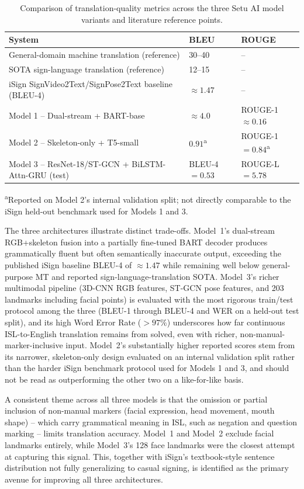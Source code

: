 \documentclass[pdflatex,sn-mathphys-num]{sn-jnl}
\begin{document}
\begin{table}[h]
\centering
\caption{Comparison of translation-quality metrics across the three Setu AI model variants and literature reference points.}\label{tab:results}
\begin{tabular}{@{}lll@{}}
\toprule
System & BLEU & ROUGE \\
\midrule
General-domain machine translation (reference) & 30--40 & -- \\
SOTA sign-language translation (reference) & 12--15 & -- \\
iSign SignVideo2Text/SignPose2Text baseline~\cite{isign} (BLEU-4) & $\approx 1.47$ & -- \\
Model 1 -- Dual-stream + BART-base & $\approx 4.0$ & ROUGE-1 $\approx 0.16$ \\
Model 2 -- Skeleton-only + T5-small & $0.91$\textsuperscript{a} & ROUGE-1 $= 0.84$\textsuperscript{a} \\
Model 3 -- ResNet-18/ST-GCN + BiLSTM-Attn-GRU (test) & BLEU-4 $= 0.53$ & ROUGE-L $= 5.78$ \\
\bottomrule
\end{tabular}
\end{table}
\noindent\textsuperscript{a}Reported on Model 2's internal validation split; not directly comparable to the iSign held-out benchmark used for Models 1 and 3.

The three architectures illustrate distinct trade-offs. Model~1's dual-stream RGB+skeleton fusion into a partially fine-tuned BART decoder produces grammatically fluent but often semantically inaccurate output, exceeding the published iSign baseline BLEU-4 of $\approx 1.47$ while remaining well below general-purpose MT and reported sign-language-translation SOTA. Model~3's richer multimodal pipeline (3D-CNN RGB features, ST-GCN pose features, and 203 landmarks including facial points) is evaluated with the most rigorous train/test protocol among the three (BLEU-1 through BLEU-4 and WER on a held-out test split), and its high Word Error Rate ($>97\%$) underscores how far continuous ISL-to-English translation remains from solved, even with richer, non-manual-marker-inclusive input. Model~2's substantially higher reported scores stem from its narrower, skeleton-only design evaluated on an internal validation split rather than the harder iSign benchmark protocol used for Models 1 and 3, and should not be read as outperforming the other two on a like-for-like basis.

A consistent theme across all three models is that the omission or partial inclusion of non-manual markers (facial expression, head movement, mouth shape) -- which carry grammatical meaning in ISL, such as negation and question marking -- limits translation accuracy. Model~1 and Model~2 exclude facial landmarks entirely, while Model~3's 128 face landmarks were the closest attempt at capturing this signal. This, together with iSign's textbook-style sentence distribution not fully generalizing to casual signing, is identified as the primary avenue for improving all three architectures.
\end{document}
